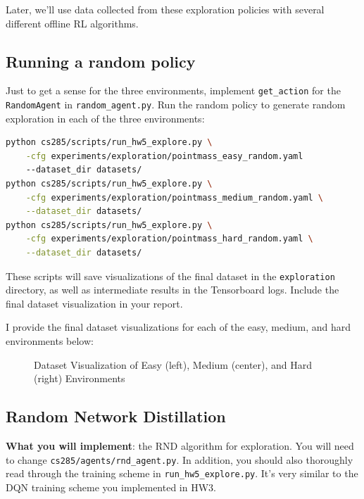 \documentclass{article}
\begin{document}
Later, we'll use data collected from these exploration policies with several different offline RL algorithms.

\subsection{Running a random policy}
Just to get a sense for the three environments, implement \verb+get_action+ for the \verb+RandomAgent+ in \verb+random_agent.py+. Run the random policy to generate random exploration in each of the three environments:
\begin{lstlisting}[language=bash]
python cs285/scripts/run_hw5_explore.py \
    -cfg experiments/exploration/pointmass_easy_random.yaml
    --dataset_dir datasets/
python cs285/scripts/run_hw5_explore.py \
    -cfg experiments/exploration/pointmass_medium_random.yaml \
    --dataset_dir datasets/
python cs285/scripts/run_hw5_explore.py \
    -cfg experiments/exploration/pointmass_hard_random.yaml \
    --dataset_dir datasets/
\end{lstlisting}
These scripts will save visualizations of the final dataset in the \verb+exploration+ directory, as well as intermediate results in the Tensorboard logs. Include the final dataset visualization in your report.

\begin{sol} I provide the final dataset visualizations for each of the easy, medium, and hard environments below:
\begin{figure}[!ht]\color{darkblue}
    \begin{center}
\end{center}
    \caption{Dataset Visualization of Easy (left), Medium (center), and Hard (right) Environments}
\end{figure}
\end{sol}

\subsection{Random Network Distillation}
\textbf{What you will implement}: the RND algorithm for exploration. You will need to change \verb+cs285/agents/rnd_agent.py+. In addition, you should also thoroughly read through the training scheme in \verb+run_hw5_explore.py+. It's very similar to the DQN training scheme you implemented in HW3.
\end{document}
